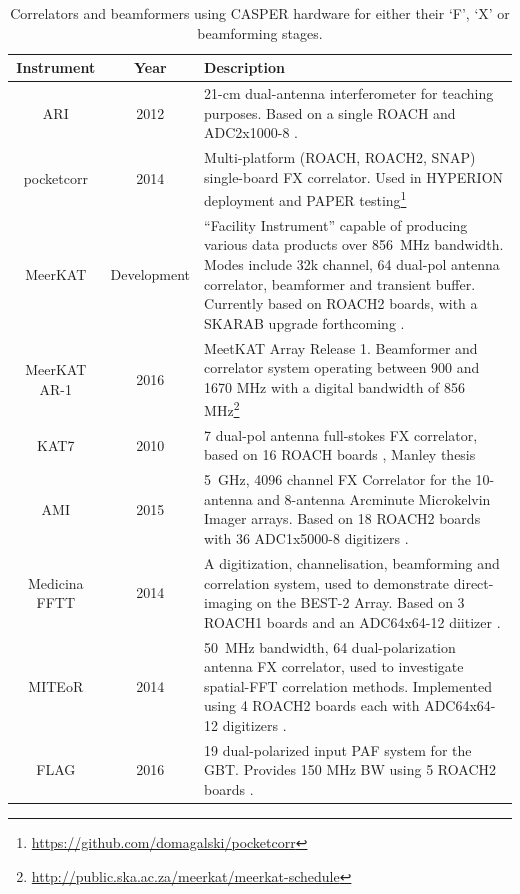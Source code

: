 \documentclass{ws-jai}
\begin{document}
\begin{table}
\label{table:casper-instruments-correlators}
\caption{Correlators and beamformers using CASPER hardware for either their `F', `X' or beamforming stages.}
\centering
\begin{tabular}{ccp{10cm}}
  Instrument & Year & Description \\
  \hline
  ARI              & 2012 & 21-cm dual-antenna interferometer for teaching purposes. Based on a single ROACH and ADC2x1000-8 \citep{MScSalas2014}. \\
  pocketcorr       & 2014 &  Multi-platform (ROACH, ROACH2, SNAP) single-board FX correlator. Used in HYPERION deployment and PAPER testing\footnote{\url{https://github.com/domagalski/pocketcorr}} \\
  MeerKAT          & Development & ``Facility Instrument'' capable of producing various data products over 856~MHz bandwidth. Modes include 32k channel, 64 dual-pol antenna correlator, beamformer and transient buffer. Currently based on ROACH2 boards, with a SKARAB upgrade forthcoming \citep{MeerKAT CBF Requirement Spec}. \\
  MeerKAT AR-1     & 2016 & MeetKAT Array Release 1. Beamformer and correlator system operating between 900 and 1670 MHz with a digital bandwidth of 856 MHz\footnote{\url{http://public.ska.ac.za/meerkat/meerkat-schedule}} \\
  KAT7             & 2010 & 7 dual-pol antenna full-stokes FX correlator, based on 16 ROACH boards \cite{Foley01082016}, Manley thesis \\
  AMI              & 2015 & 5~GHz, 4096 channel FX Correlator for the 10-antenna and 8-antenna Arcminute Microkelvin Imager arrays. Based on 18 ROACH2 boards with 36 ADC1x5000-8 digitizers \citep{Zwart21122008,Hickish et al. (in prep)}. \\
  Medicina FFTT    & 2014 & A digitization, channelisation, beamforming and correlation system, used to demonstrate direct-imaging on the BEST-2 Array. Based on 3 ROACH1 boards and an ADC64x64-12 diitizer \citep{Foster11042014}. \\
  MITEoR           & 2014 & 50~MHz bandwidth, 64 dual-polarization antenna FX correlator, used to investigate spatial-FFT correlation methods. Implemented using 4 ROACH2 boards each with ADC64x64-12 digitizers \citep{2014MNRAS.445.1084Z}. \\
  FLAG             & 2016 & 19 dual-polarized input PAF system for the GBT. Provides 150 MHz BW using 5 ROACH2 boards \citep{gb_flag, gb_beamformer}. \\

\end{tabular}
\end{table}
\end{document}
